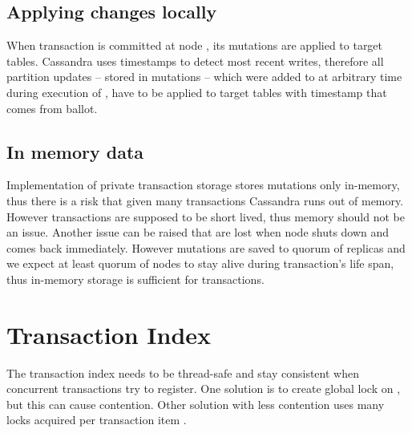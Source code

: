\subsection{Applying changes locally}
When transaction \transaction is committed at node , its mutations are applied to target tables.
Cassandra uses timestamps to detect most recent writes, therefore all partition updates -- stored in mutations -- 
which were added to \txStorage at arbitrary time during execution of \transaction, have to be applied to target tables with timestamp that comes from \paxos ballot.



\subsection{In memory data}
Implementation of private transaction storage \txStorage stores mutations \mutations only in-memory, thus there is a risk that given many transactions Cassandra runs out of memory. However transactions are supposed to be short lived, thus memory should not be an issue.
Another issue can be raised that \mutations are lost when node shuts down and comes back immediately. 
However mutations are saved to quorum of replicas and we expect at least quorum of nodes to stay alive during transaction’s life span, thus in-memory storage is sufficient for transactions.


\section{Transaction Index}
The transaction index \txIndex needs to be thread-safe and stay consistent when concurrent transactions try to register. One solution is to create global lock on \txIndex, but this can cause contention. Other solution with less contention uses many locks acquired per transaction item \txItem.

